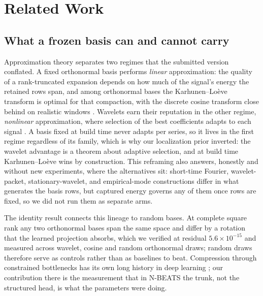 %
%

\section{Related Work}
\label{sec:related}

\subsection{What a frozen basis can and cannot carry}
\label{sec:related:approximation}

Approximation theory separates two regimes that the submitted version
conflated. A fixed orthonormal basis performs \emph{linear}
approximation: the quality of a rank-truncated expansion depends on how
much of the signal's energy the retained rows span, and among
orthonormal bases the Karhunen--Lo\`eve transform is optimal for that
compaction, with the discrete cosine transform close behind on realistic
windows \citep{mallat1989wavelet}. Wavelets earn their reputation in the
other regime, \emph{nonlinear} approximation, where selection of the
best coefficients adapts to each signal \citep{daubechies1992ten}. A
basis fixed at build time never adapts per series, so it lives in the
first regime regardless of its family, which is why our localization
prior inverted: the wavelet advantage is a theorem about adaptive
selection, and at build time Karhunen--Lo\`eve wins by construction.
This reframing also answers, honestly and without new experiments, where
the alternatives sit: short-time Fourier, wavelet-packet,
stationary-wavelet, and empirical-mode constructions differ in what
generates the basis rows, but captured energy governs any of them once
rows are fixed, so we did not run them as separate arms.

The identity result connects this lineage to random bases. At complete
square rank any two orthonormal bases span the same space and differ by
a rotation that the learned projection absorbs, which we verified at
residual $5.6 \times 10^{-15}$ and measured across wavelet, cosine and
random orthonormal draws; random draws therefore serve as controls
rather than as baselines to beat. Compression through constrained
bottlenecks has its own long history in deep learning
\citep{hinton2006reducing, vincent2008denoising}; our contribution there
is the measurement that in N-BEATS the trunk, not the structured head,
is what the parameters were doing.


